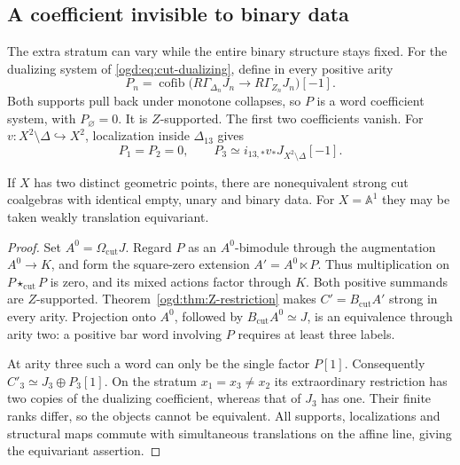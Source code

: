 \subsection{A coefficient invisible to binary data}

The extra stratum can vary while the entire binary structure stays fixed.
For the dualizing system of \eqref{ogd:eq:cut-dualizing}, define in every positive arity
\begin{equation}\label{ogd:eq:hidden-coefficient}
 P_n=\operatorname{cofib}
 \bigl(R\Gamma_{\Delta_n}J_n\longrightarrow R\Gamma_{Z_n}J_n\bigr)[-1].
\end{equation}
Both supports pull back under monotone collapses, so $P$ is a word
coefficient system, with $P_\varnothing=0$. It is $Z$-supported.
The first two coefficients vanish. For
$v:X^2\setminus\Delta\hookrightarrow X^2$, localization inside
$\Delta_{13}$ gives
\[
 P_1=P_2=0,\qquad
 P_3\simeq i_{13,*}v_*J_{X^2\setminus\Delta}[-1].
\]

\begin{proposition}\label{ogd:prop:binary-invisible}
If $X$ has two distinct geometric points, there are nonequivalent strong
cut coalgebras with identical empty, unary and binary data.
For $X=\mathbb A^1$ they may be taken weakly translation equivariant.
\end{proposition}

\begin{proof}
Set $A^0=\Omega_{\mathrm{cut}}J$. Regard $P$ as an $A^0$-bimodule through
the augmentation $A^0\to K$, and form the square-zero extension
$A'=A^0\ltimes P$. Thus multiplication on $P\star_{\mathrm{cut}}P$ is
zero, and its mixed actions factor through $K$.
Both positive summands are $Z$-supported. Theorem~\ref{ogd:thm:Z-restriction}
makes $C'=B_{\mathrm{cut}}A'$ strong in every arity.
Projection onto $A^0$, followed by $B_{\mathrm{cut}}A^0\simeq J$,
is an equivalence through arity two: a positive bar word involving $P$
requires at least three labels.

At arity three such a word can only be the single factor $P[1]$.
Consequently $C'_3\simeq J_3\oplus P_3[1]$.
On the stratum $x_1=x_3\ne x_2$ its extraordinary restriction has two
copies of the dualizing coefficient, whereas that of $J_3$ has one.
Their finite ranks differ, so the objects cannot be equivalent.
All supports, localizations and structural maps commute with simultaneous
translations on the affine line, giving the equivariant assertion.
\end{proof}

